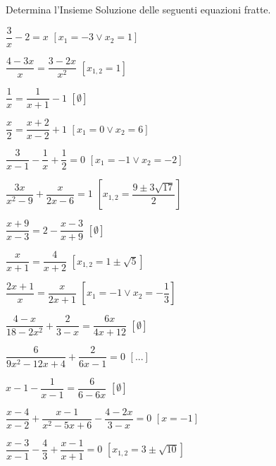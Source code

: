 \subsection*{}

\begin{esercizio}[*]
\label{ese:3.39}
Determina l'Insieme Soluzione delle seguenti equazioni fratte.
\begin{htmulticols}{2}
\begin{enumeratea}
\item\(\dfrac{3}{x}-2 = x\)
  \hfill\(\left[x_{1} =-3 \vee x_{2} = 1\right]\)
\item\(\dfrac{4-3 x}{x}=\dfrac{3-2 x}{x^{2}}\)
  \hfill\(\left[x_{1,2}= 1\right]\)
\item\(\dfrac{1}{x} = \dfrac{1}{x + 1}-1\)
  \hfill\(\left[\emptyset\right]\)
\item\(\dfrac{x}{2} = \dfrac{x + 2}{x-2} + 1\)
  \hfill\(\left[x_{1} = 0 \vee x_{2} = 6\right]\)
\item\(\dfrac{3}{x-1}-\dfrac{1}{x} + \dfrac{1}{2} = 0\)
  \hfill\(\left[x_{1} =-1 \vee x_{2} =-2\right]\)
\item\(\dfrac{3 x}{x^{2}-9} + \dfrac{x}{2 x-6}=1\)
  \hfill\(\left[x_{1,2} = \dfrac{9 \pm 3 \sqrt{17}}{2}\right]\)
\item\(\dfrac{x + 9}{x-3}=2-\dfrac{x-3}{x + 9}\)
  \hfill\(\left[\emptyset\right]\)
\item\(\dfrac{x}{x + 1} = \dfrac{4}{x + 2}\)
  \hfill\(\left[x_{1,2} = 1 \pm \sqrt{5}\right]\)
\item\(\dfrac{2 x + 1}{x} = \dfrac{x}{2 x + 1}\)
  \hfill\(\left[x_{1} =-1 \vee x_{2} =-\dfrac{1}{3}\right]\)
\item\(\dfrac{4-x}{18-2 x^{2}} + \dfrac{2}{3-x} = \dfrac{6 x}{4 x +12}\)
  \hfill\(\left[\emptyset\right]\)
\item\(\dfrac{6}{9 x^{2}-12 x + 4} + \dfrac{2}{6x -1} =0\)
  \hfill\(\left[...\right]\)
\item\(x-1-\dfrac{1}{x-1} = \dfrac{6}{6-6 x}\)
  \hfill\(\left[\emptyset\right]\)
\item\(\dfrac{x-4}{x-2} + \dfrac{x-1}{x^{2}-5 x + 6}-\dfrac{4 -2 x}{3-x} = 0\)
  \hfill\(\left[x =-1\right]\)
\item\(\dfrac{x-3}{x-1}-\dfrac{4}{3} + \dfrac{x-1}{x + 1}=0\)
  \hfill\(\left[x_{1,2} = 3 \pm \sqrt{10}\right]\)
\end{enumeratea}
\end{htmulticols}
\end{esercizio}

